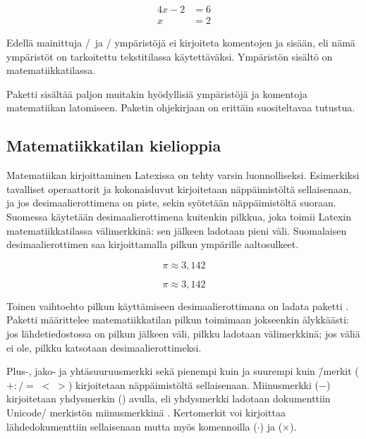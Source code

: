 \begin{koodilohkosis}
\begin{align*}
  4x - 2 &= 6 \\
  x      &= 2
\end{align*}
\end{koodilohkosis}

\noindent
Edellä mainittuja \-/\ ja \-/
ympäristöjä ei kirjoiteta komentojen \komento{[} ja \komento{]} sisään,
eli nämä ympäristöt on tarkoitettu tekstitilassa käytettäväksi.
Ympäristön sisältö on matematiikkatilassa.

Paketti  sisältää paljon muitakin hyödyllisiä
ympäristöjä ja komentoja matematiikan latomiseen. Paketin ohjekirjaan on
erittäin suositeltavaa tutustua.

\subsection{Matematiikkatilan kielioppia}

Matematiikan kirjoittaminen Latexissa on tehty varsin luonnolliseksi.
Esimerkiksi tavalliset operaattorit ja kokonaisluvut kirjoitetaan
näppäimistöltä sellaisenaan, ja jos desimaalierottimena on piste, sekin
syötetään näppäimistöltä suoraan. Suomessa käytetään desimaalierottimena
kuitenkin pilkkua, joka toimii Latexin matematiikkatilassa välimerkkinä:
sen jälkeen ladotaan pieni väli. Suomalaisen desimaalierottimen saa
kirjoittamalla pilkun ympärille aaltosulkeet.

\begin{koodilohkosis}
\[ \pi \approx 3{,}142 \]
\end{koodilohkosis}
\[ \pi \approx 3{,}142 \]

\noindent
Toinen vaihtoehto pilkun käyttämiseen desimaalierottimana on ladata
paketti . Paketti määrittelee matematiikkatilan
pilkun toimimaan jokseenkin älykkäästi: jos lähdetiedostossa on pilkun
jälkeen väli, pilkku ladotaan välimerkkinä; jos väliä ei ole, pilkku
katsotaan desimaalierottimeksi.

Plus-, jako- ja yhtäsuuruusmerkki sekä pienempi kuin ja suurempi kuin
\=/merkit ($+ : / = \; < \; >$) kirjoitetaan näppäimistöltä
sellaisenaan. Miinusmerkki ($-$) kirjoitetaan yhdysmerkin (\koodi{-})
avulla, eli yhdysmerkki ladotaan dokumenttiin Unicode\-/ merkistön
miinusmerkkinä . Kertomerkit voi kirjoittaa
lähdedokumenttiin sellaisenaan mutta myös komennoilla 
($\cdot$) ja  ($\times$).

